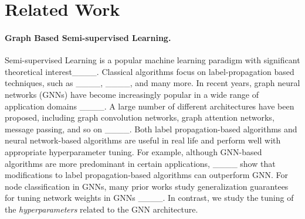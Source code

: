 \section{Related Work}
\paragraph{Graph Based Semi-supervised Learning.} Semi-supervised Learning is a popular machine learning paradigm with significant theoretical interest____. Classical algorithms focus on label-propagation based techniques, such as ____, ____, and many more. 
In recent years, graph neural networks (GNNs) have become increasingly popular in a wide range of application domains
____.
A large number of different architectures have been proposed, including graph convolution networks, graph attention networks, message passing, and so on ____. 
Both label propagation-based algorithms and neural network-based algorithms are useful in real life and perform  well with appropriate hyperparameter tuning. For example, although GNN-based algorithms are more predominant in certain applications, ____ show that modifications to label propagation-based algorithms can outperform GNN. For node classification in GNNs, many prior works study generalization guarantees for tuning network weights in GNNs ____. In contrast, we study the tuning of the \textit{hyperparameters} related to the GNN architecture. 

